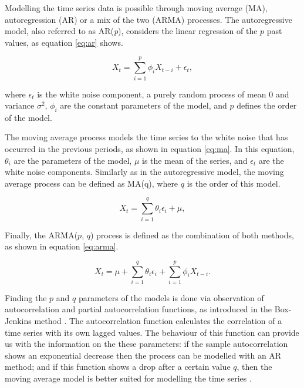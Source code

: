 \par Modelling the time series data is possible through moving average (MA), autoregression (AR) or a mix of the two (ARMA) processes. 
The autoregressive model, also referred to as AR(\textit{p}), considers the linear regression of the $p$ past values, as equation \ref{eq:ar} shows.

\begin{equation}
    X_t = \sum^p_{i=1}\phi_i X_{t-i} + \epsilon_t,
    \label{eq:ar}
\end{equation}

\par where $\epsilon_t$ is the white noise component, a purely random process of mean 0 and variance $\sigma^2$, $\phi_i$ are the constant parameters of the model,
and $p$ defines the order of the model.

\par The moving average process models the time series to the white noise that has occurred in the previous periods, as shown in equation \ref{eq:ma}. In this
equation, $\theta_i$ are the parameters of the model, $\mu$ is the mean of the series, and $\epsilon_t$ are the white noise components. Similarly as in the 
autoregressive model, the moving average process can be defined as MA(q), where $q$ is the order of this model.

\begin{equation}
    X_t = \sum^q_{i=1}\theta_i\epsilon_i + \mu,
    \label{eq:ma}
\end{equation}

\par Finally, the ARMA($p$, $q$) process is defined as the combination of both methods, as shown in equation \ref{eq:arma}.

\begin{equation}
    X_t = \mu + \sum^q_{i=1}\theta_i\epsilon_i + \sum^p_{i=1}\phi_i X_{t-i}.
    \label{eq:arma}
\end{equation}

\par Finding the $p$ and $q$ parameters of the models is done via observation of autocorrelation and partial autocorrelation functions, as introduced in the
Box-Jenkins method \cite{box_time_2016}. The autocorrelation function calculates the correlation of a time series with its own lagged values. The behaviour 
of this function can provide us with the information on the these parameters: if the sample autocorrelation shows an exponential decrease then the process can be 
modelled with an AR method; and if this function shows a drop after a certain value $q$, then the moving average model is better suited for modelling the time series
\cite{munz_traffic_2010}.

